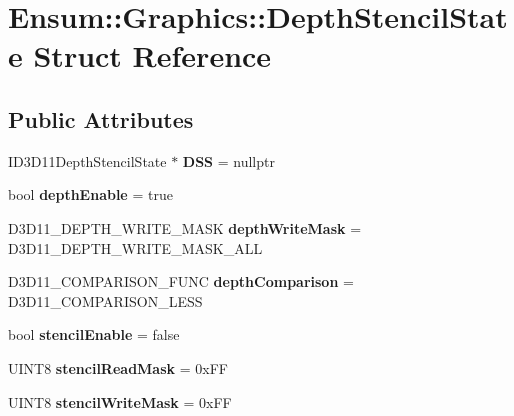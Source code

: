 \hypertarget{struct_ensum_1_1_graphics_1_1_depth_stencil_state}{}\section{Ensum\+:\+:Graphics\+:\+:Depth\+Stencil\+State Struct Reference}
\label{struct_ensum_1_1_graphics_1_1_depth_stencil_state}
\subsection*{Public Attributes}
\begin{DoxyCompactItemize}
\item 
I\+D3\+D11\+Depth\+Stencil\+State $\ast$ {\bfseries D\+SS} = nullptr\hypertarget{struct_ensum_1_1_graphics_1_1_depth_stencil_state_a0eda3ff24b49370c55ebac4e4005e9e3}{}\label{struct_ensum_1_1_graphics_1_1_depth_stencil_state_a0eda3ff24b49370c55ebac4e4005e9e3}

\item 
bool {\bfseries depth\+Enable} = true\hypertarget{struct_ensum_1_1_graphics_1_1_depth_stencil_state_afe7a1623a3c1bf7c4843d7e0d911b109}{}\label{struct_ensum_1_1_graphics_1_1_depth_stencil_state_afe7a1623a3c1bf7c4843d7e0d911b109}

\item 
D3\+D11\+\_\+\+D\+E\+P\+T\+H\+\_\+\+W\+R\+I\+T\+E\+\_\+\+M\+A\+SK {\bfseries depth\+Write\+Mask} = D3\+D11\+\_\+\+D\+E\+P\+T\+H\+\_\+\+W\+R\+I\+T\+E\+\_\+\+M\+A\+S\+K\+\_\+\+A\+LL\hypertarget{struct_ensum_1_1_graphics_1_1_depth_stencil_state_a688b85ba9c0577fe39aac432d9d78b16}{}\label{struct_ensum_1_1_graphics_1_1_depth_stencil_state_a688b85ba9c0577fe39aac432d9d78b16}

\item 
D3\+D11\+\_\+\+C\+O\+M\+P\+A\+R\+I\+S\+O\+N\+\_\+\+F\+U\+NC {\bfseries depth\+Comparison} = D3\+D11\+\_\+\+C\+O\+M\+P\+A\+R\+I\+S\+O\+N\+\_\+\+L\+E\+SS\hypertarget{struct_ensum_1_1_graphics_1_1_depth_stencil_state_a1a550c0d390f87b4571a2dd0f807d5bb}{}\label{struct_ensum_1_1_graphics_1_1_depth_stencil_state_a1a550c0d390f87b4571a2dd0f807d5bb}

\item 
bool {\bfseries stencil\+Enable} = false\hypertarget{struct_ensum_1_1_graphics_1_1_depth_stencil_state_a4130e5ac3b4651eeb059c39805eff89e}{}\label{struct_ensum_1_1_graphics_1_1_depth_stencil_state_a4130e5ac3b4651eeb059c39805eff89e}

\item 
U\+I\+N\+T8 {\bfseries stencil\+Read\+Mask} = 0x\+FF\hypertarget{struct_ensum_1_1_graphics_1_1_depth_stencil_state_aecd3bef478e6e09e8fb922bfa7da6b6c}{}\label{struct_ensum_1_1_graphics_1_1_depth_stencil_state_aecd3bef478e6e09e8fb922bfa7da6b6c}

\item 
U\+I\+N\+T8 {\bfseries stencil\+Write\+Mask} = 0x\+FF\hypertarget{struct_ensum_1_1_graphics_1_1_depth_stencil_state_a0627f6674b5c6fc32d0e0d0ffb8551f1}{}\label{struct_ensum_1_1_graphics_1_1_depth_stencil_state_a0627f6674b5c6fc32d0e0d0ffb8551f1}

\end{DoxyCompactItemize}


